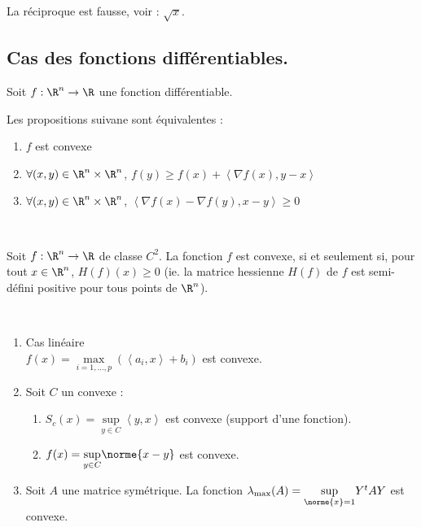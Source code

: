 \documentclass[12pt,a4paper]{article}
\begin{document}
	\begin{rmq}
		La réciproque est fausse, voir : $\sqrt x$.
	\end{rmq}
	
	\subsection{Cas des fonctions différentiables.}
	
	\begin{thm}
		Soit $f : \R^n \to \R$ une fonction différentiable.
		
		\begin{minipage}{17cm}
			Les propositions suivane sont équivalentes : 
			\begin{enumerate}
				\item  $f$ est convexe
				\item  $\forall (x,y) \in \R^n \times \R^n$, $f(y) \geq f(x) + \left<\nabla f(x),y-x\right>$
				\item $\forall (x,y) \in \R^n\times\R^n$, $\left<\nabla f(x) - \nabla f(y), x-y\right> \geq 0$
			\end{enumerate}
		\end{minipage}
	\end{thm}
	
	\begin{thm}$ $
		
		\begin{minipage}{17cm}
			Soit $f : \R^n \to \R$ de classe $C^2$. La fonction  $f$ est convexe, si et seulement si, pour tout $x \in \R^n$, $H(f)(x) \geq 0$ (ie. la matrice hessienne $H(f)$ de $f$ est semi-défini positive pour tous points de $\R^n$).
		\end{minipage}
	\end{thm}
	
	\begin{ex}
		$ $
		
		\begin{minipage}{17cm}
			\begin{enumerate}[label=\textbullet]
				\item Cas linéaire\\
				$f(x) = \underset{i = 1,\ldots,p}\max\left(\left< a_i,x\right>+b_i\right)$ est convexe.
				
				\item Soit $C$ un convexe :
				\begin{enumerate}[label=-]
					\item $S_c(x) = \underset{y \in C}\sup \left< y,x\right>$ est convexe (support d'une fonction).
					\item $f(x) = \underset{y\in C}\sup \norme{x-y}$ est convexe.
				\end{enumerate}
				
				\item Soit $A$ une matrice symétrique. La fonction $\lambda_{\max}(A) = \underset{\norme{x} = 1}{\sup} Y^t A Y$ est convexe.
			\end{enumerate}
		\end{minipage}
	\end{ex}
	
\end{document}
